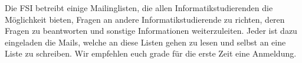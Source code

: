 
Die FSI betreibt einige Mailinglisten, die allen Informatikstudierenden die Möglichkeit 
bieten, Fragen an andere Informatikstudierende zu richten, deren Fragen zu beantworten 
und sonstige Informationen weiterzuleiten. Jeder ist dazu eingeladen die Mails, welche 
an diese Listen gehen zu lesen und selbst an eine Liste zu schreiben. Wir empfehlen euch 
grade für die erste Zeit eine Anmeldung.

\newcommand{\mladressen}[1]{
    Anmelden: Leere Mail an {\footnotesize \email{#1-subscribe@fsi.uni-tuebingen.de}} \\
    Abmelden: Leere Mail an {\footnotesize \email{#1-unsubscribe@fsi.uni-tuebingen.de}} \\
    Hilfetext: Mail mit Betreff \emph{help} an {\footnotesize \email{#1-request@fsi.uni-tuebingen.de}}}

